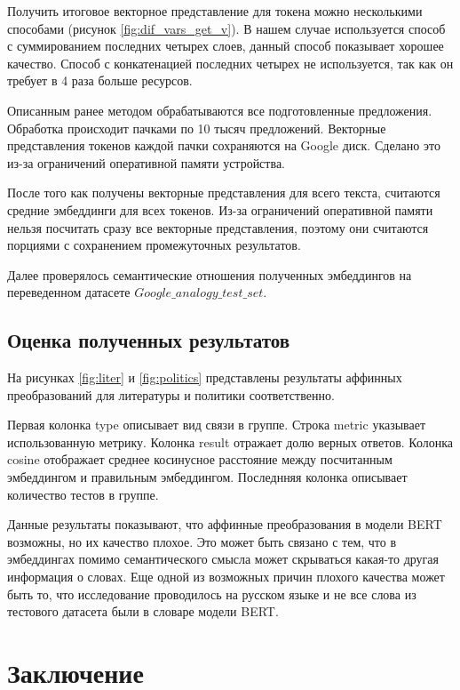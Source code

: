 \documentclass[a4paper,14pt]{article}
\begin{document}
	Получить итоговое векторное представление для токена можно несколькими способами (рисунок \ref{fig:dif_vars_get_v}).
	В нашем случае используется способ с суммированием последних четырех слоев, данный способ показывает хорошее качество.
	Способ с конкатенацией последних четырех не используется, так как он требует в 4 раза больше ресурсов.
	
	Описанным ранее методом обрабатываются все подготовленные предложения.
	Обработка происходит пачками по 10 тысяч предложений.
	Векторные представления токенов каждой пачки сохраняются на Google диск.
	Сделано это из-за ограничений оперативной памяти устройства.
	
	После того как получены векторные представления для всего текста, считаются средние эмбеддинги для всех токенов.
	Из-за ограничений оперативной памяти нельзя посчитать сразу все векторные представления, поэтому они считаются порциями с сохранением промежуточных результатов.
	
	Далее проверялось семантические отношения полученных эмбеддингов на переведенном датасете $Google\_analogy\_test\_set$.
	
	\subsection{Оценка полученных результатов}
	
	На рисунках \ref{fig:liter} и \ref{fig:politics} представлены результаты аффинных преобразований для литературы и политики соответственно.
	
	Первая колонка type описывает вид связи в группе.
	Строка metric указывает использованную метрику.
	Колонка result отражает долю верных ответов.
	Колонка cosine отображает среднее косинусное расстояние между посчитанным эмбеддингом и правильным эмбеддингом.
	Последнняя колонка описывает количество тестов в группе.
	
	Данные результаты показывают, что аффинные преобразования в модели BERT возможны, но их качество плохое.
	Это может быть связано с тем, что в эмбеддингах помимо семантического смысла может скрываться какая-то другая информация о словах.
	Еще одной из возможных причин плохого качества может быть то, что исследование проводилось на русском языке и не все слова из тестового датасета были в словаре модели BERT.
	
	
	\pagebreak
	\section{Заключение}
	
\end{document}
